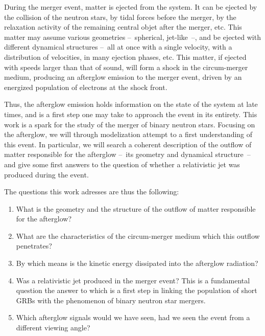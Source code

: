 During the merger event, matter is ejected from the system. It can be ejected by the collision of the neutron stars, by tidal forces before the merger, by the relaxation activity of the remaining central objet after the merger, etc. This matter may assume various geometries --~spherical, jet-like~--, and be ejected with different dynamical structures --~all at once with a single velocity, with a distribution of velocities, in many ejection phases, etc. This matter, if ejected with speeds larger than that of sound, will form a shock in the circum-merger medium, producing an afterglow emission to the merger event, driven by an energized population of electrons at the shock front.

Thus, the afterglow emission holds information on the state of the system at late times, and is a first step one may take to approach the event in its entirety. This work is a spark for the study of the merger of binary neutron stars. Focusing on the afterglow, we will through modelization attempt to a first understanding of this event. In particular, we will search a coherent description of the outflow of matter responsible for the afterglow --~its geometry and dynamical structure~-- and give some first answers to the question of whether a relativistic jet was produced during the event.

The questions this work adresses are thus the following:

\begin{enumerate}
	\item What is the geometry and the structure of the outflow of matter responsible for the afterglow?
	\item What are the characteristics of the circum-merger medium which this outflow penetrates?
	\item By which means is the kinetic energy dissipated into the afterglow radiation?
	\item Was a relativistic jet produced in the merger event? This is a fundamental question the answer to which is a first step in linking the population of short GRBs with the phenomenon of binary neutron star mergers.
	\item Which afterglow signals would we have seen, had we seen the event from a different viewing angle?
\end{enumerate}
